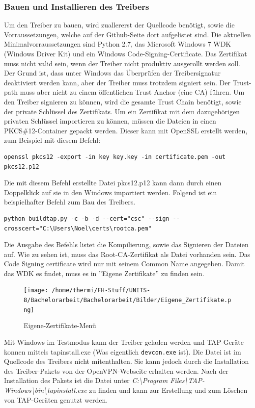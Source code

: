 {\subsubsection{Bauen und Installieren des Treibers}
Um den Treiber zu bauen, wird zuallererst der Quellcode benötigt, sowie die
Vorraussetzungen, welche auf der Github-Seite dort aufgelistet sind.
Die aktuellen Minimalvorraussetzungen sind Python 2.7, das Microsoft Windows 7 WDK (Windows Driver Kit)
und ein Windows Code-Signing-Certificate.
Das Zertifikat muss nicht valid sein, wenn der Treiber nicht produktiv ausgerollt
werden soll. Der Grund ist, dass unter Windows das Überprüfen der Treibersignatur deaktiviert
werden kann, aber der Treiber muss trotzdem signiert sein. Der Trust-path muss aber nicht
zu einem öffentlichen Trust Anchor (eine CA) führen. Um den Treiber signieren zu können,
wird die gesamte Trust Chain benötigt, sowie der private Schlüssel des Zertifikats.
Um ein Zertifikat mit dem dazugehörigen privaten Schlüssel importieren zu können,
müssen die Dateien in einen PKCS\#12-Container gepackt werden. Dieser kann mit 
OpenSSL erstellt werden, zum Beispiel mit diesem Befehl:
\begin{lstlisting}[caption=OpenSSL PKCS\#12]
openssl pkcs12 -export -in key key.key -in certificate.pem -out pkcs12.p12
\end{lstlisting}
Die mit diesem Befehl erstellte Datei pkcs12.p12 kann dann durch einen Doppelklick auf sie
in den Windows importiert werden.
Folgend ist ein beispielhafter Befehl zum Bau des Treibers.
\begin{lstlisting}[caption=TAP-Windows bauen]
python buildtap.py -c -b -d --cert="csc" --sign --crosscert="C:\Users\Noel\certs\rootca.pem"
\end{lstlisting}
Die Ausgabe des Befehls listet die Kompilierung, sowie das Signieren der Dateien auf.
Wie zu sehen ist, muss das Root-CA-Zertifikat als Datei vorhanden sein.
Das Code Signing certificate wird nur mit seinem Common Name angegeben.
Damit das WDK es findet, muss es in ''Eigene Zertifikate'' zu finden sein.
\begin{figure}
\texttt{[image: /home/thermi/FH-Stuff/UNITS-8/Bachelorarbeit/Bachelorarbeit/Bilder/Eigene\_Zertifikate.png]}
\caption{Eigene-Zertifikate-Menü}
\label{fig:Eigene-Zertifikate-Menue}
\end{figure}

Mit Windows im Testmodus kann der Treiber geladen werden und TAP-Geräte konnen
mittels tapinstall.exe (Was eigentlich \texttt{devcon.exe} ist). Die Datei ist im Quellcode des
Treibers nicht mitenthalten. Sie kann jedoch durch die Installation des Treiber-Pakets
von der OpenVPN-Webseite erhalten werden. Nach der Installation des Pakets
ist die Datei unter \textit{C:\textbackslash{}Program Files\textbackslash{}TAP-Windows\textbackslash{}bin\textbackslash{}tapinstall.exe}
zu finden und kann zur Erstellung und zum Löschen von TAP-Geräten genutzt werden.

}
